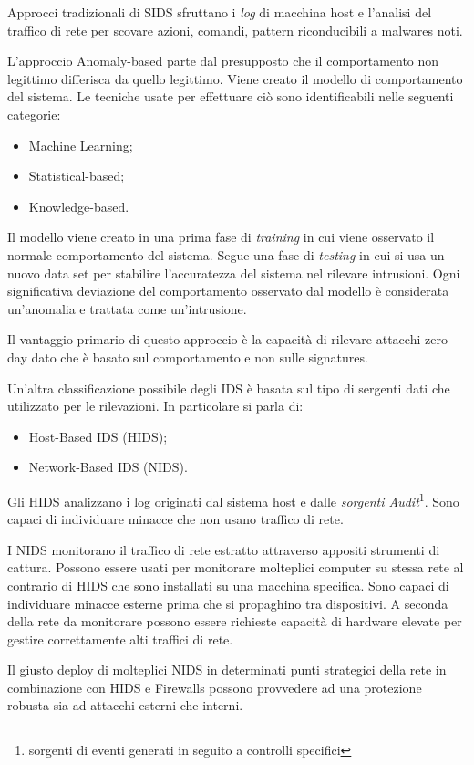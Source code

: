 Approcci tradizionali di SIDS sfruttano i \textit{log} di macchina host e l'analisi del traffico di rete per scovare azioni, comandi, pattern riconducibili a malwares noti.


L'approccio Anomaly-based parte dal presupposto che il comportamento non legittimo differisca da quello legittimo.
Viene creato il modello di comportamento del sistema. Le tecniche usate per effettuare ciò sono identificabili nelle seguenti categorie:
\begin{itemize}
    \item Machine Learning;
    \item Statistical-based;
    \item Knowledge-based.
\end{itemize}
Il modello viene creato in una prima fase di \textit{training} in cui viene osservato il normale comportamento del sistema. Segue una fase di \textit{testing} in cui si usa un nuovo data set per stabilire l'accuratezza del sistema nel rilevare intrusioni. 
Ogni significativa deviazione del comportamento osservato dal modello è considerata un'anomalia e trattata come un'intrusione.

Il vantaggio primario di questo approccio è la capacità di rilevare attacchi zero-day dato che è basato sul comportamento e non sulle signatures.


Un'altra classificazione possibile degli IDS è basata sul tipo di sergenti dati che utilizzato per le rilevazioni.  In particolare si parla di:
\begin{itemize}
    \item Host-Based IDS (HIDS);
    \item Network-Based IDS (NIDS).
\end{itemize}

Gli HIDS analizzano i log originati dal sistema host e dalle \textit{sorgenti Audit}\footnote{sorgenti di eventi generati in seguito a controlli specifici}. Sono capaci di individuare minacce che non usano traffico di rete.

I NIDS monitorano il traffico di rete estratto attraverso appositi strumenti di cattura. Possono essere usati per monitorare molteplici computer su stessa rete al contrario di HIDS che sono installati su una macchina specifica. Sono capaci di individuare minacce esterne prima che si propaghino tra dispositivi. A seconda della rete da monitorare possono essere richieste capacità di hardware elevate per gestire correttamente alti traffici di rete.


Il giusto deploy di molteplici NIDS in determinati punti strategici della rete in combinazione con HIDS e Firewalls possono provvedere ad una  protezione robusta sia ad attacchi esterni che interni.

